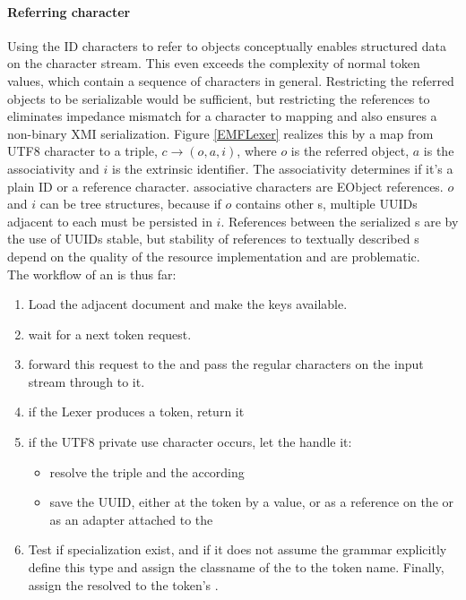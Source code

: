 \paragraph{Referring character} \label{lexer:RefEObj} Using the ID characters to refer to objects conceptually enables structured data on the character stream. This even exceeds the complexity of normal token values, which contain a sequence of characters in general. Restricting the referred objects to be serializable would be sufficient, but restricting the references to  eliminates impedance mismatch for a character to  mapping and also ensures a non-binary XMI serialization. Figure \ref{EMFLexer} realizes this by a map from UTF8 character to a triple, $c \rightarrow (o,a,i)$, where $o$ is the referred object, $a$ is the associativity and $i$ is the extrinsic identifier. The associativity determines if it's a plain ID or a reference character.  associative characters are EObject references. $o$ and $i$ can be tree structures, because if $o$ contains other s, multiple UUIDs adjacent to each  must be persisted in $i$. References between the serialized s are by the use of UUIDs stable, but stability of references to textually described s depend on the quality of the resource implementation and are problematic. \\
The workflow of an  is thus far:
\begin{enumerate}
	\item Load the adjacent document and make the keys available.
	\item wait for a next token request.
	\item forward this request to the  and pass the regular characters on the input stream through to it.
	\item if the Lexer produces a token, return it
	\item if the UTF8 private use character occurs, let the  handle it:
		\begin{itemize}
			\item resolve the triple and the according 
			\item save the UUID, either at the token by a value, or as a reference on the  or as an adapter attached to the  
		\end{itemize} 
	\item Test if specialization  exist, and if it does not assume the grammar explicitly define this type and assign the classname of the  to the token name. Finally, assign the resolved  to the token's .
\end{enumerate}

